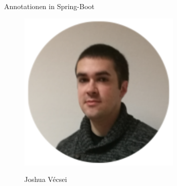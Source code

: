 \documentclass[final]{beamer}
\newlength{\sepwid}
\newlength{\onecolwid}
\begin{document}
\begin{frame}
\begin{columns}[t]
\begin{column}{\onecolwid}
\begin{block}{Annotationen in Spring-Boot}
\begin{figure}
\begin{minipage}[t]{0.40\textwidth}
\includegraphics[width=1.0\textwidth]{joshua} 
\begin{center}
	Joshua Vécsei
\end{center}
\end{minipage}\hfill%

\end{figure}


\end{block}


\end{column} %

\begin{column}{\sepwid}\end{column} %

\end{columns} %

\end{frame} %
\end{document}
